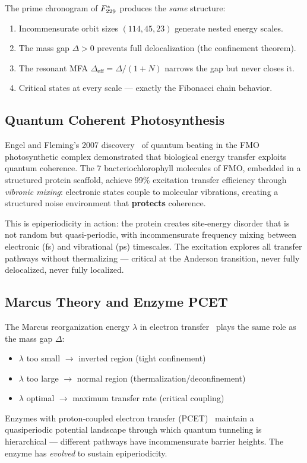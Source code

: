 The prime chronogram of $F_{229}^*$ produces the \emph{same} structure:
\begin{enumerate}
  \item Incommensurate orbit sizes $(114, 45, 23)$ generate nested energy scales.
  \item The mass gap $\Delta > 0$ prevents full delocalization (the confinement theorem).
  \item The resonant MFA $\Delta_{\mathrm{eff}} = \Delta/(1+N)$ narrows the gap but never closes it.
  \item Critical states at every scale --- exactly the Fibonacci chain behavior.
\end{enumerate}

\subsection{Quantum Coherent Photosynthesis}

Engel and Fleming's 2007 discovery~\cite{Engel07} of quantum beating in the FMO photosynthetic complex demonstrated that biological energy transfer exploits quantum coherence.  The 7 bacteriochlorophyll molecules of FMO, embedded in a structured protein scaffold, achieve 99\% excitation transfer efficiency through \emph{vibronic mixing}: electronic states couple to molecular vibrations, creating a structured noise environment that \textbf{protects} coherence.

This is epiperiodicity in action: the protein creates site-energy disorder that is not random but quasi-periodic, with incommensurate frequency mixing between electronic (fs) and vibrational (ps) timescales.  The excitation explores all transfer pathways without thermalizing --- critical at the Anderson transition, never fully delocalized, never fully localized.

\subsection{Marcus Theory and Enzyme PCET}

The Marcus reorganization energy $\lambda$ in electron transfer~\cite{Marcus56} plays the same role as the mass gap $\Delta$:
\begin{itemize}
  \item $\lambda$ too small $\to$ inverted region (tight confinement)
  \item $\lambda$ too large $\to$ normal region (thermalization/deconfinement)
  \item $\lambda$ optimal $\to$ maximum transfer rate (critical coupling)
\end{itemize}
Enzymes with proton-coupled electron transfer (PCET)~\cite{HammesSchiffer10} maintain a quasiperiodic potential landscape through which quantum tunneling is hierarchical --- different pathways have incommensurate barrier heights.  The enzyme has \emph{evolved} to sustain epiperiodicity.

